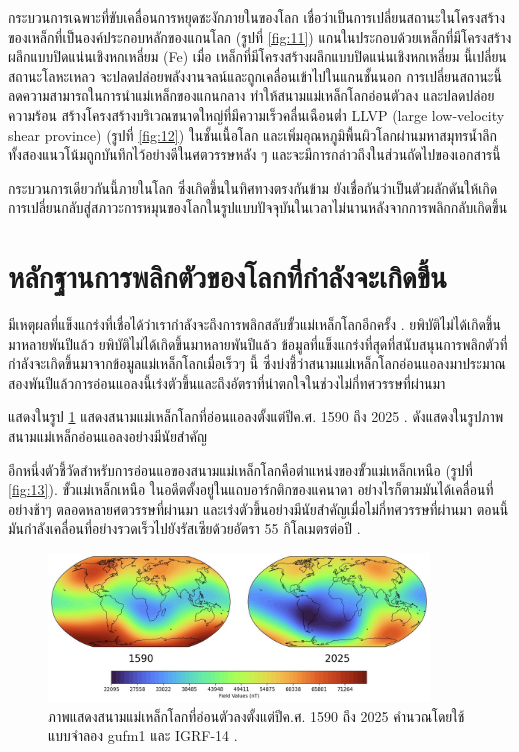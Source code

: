 \documentclass[10pt,twocolumn,letterpaper]{article}
\begin{document}
กระบวนการเฉพาะที่ขับเคลื่อนการหยุดชะงักภายในของโลก เชื่อว่าเป็นการเปลี่ยนสถานะในโครงสร้างของเหล็กที่เป็นองค์ประกอบหลักของแกนโลก (รูปที่ \ref{fig:11}) แกนในประกอบด้วยเหล็กที่มีโครงสร้างผลึกแบบปิดแน่นเชิงหกเหลี่ยม (Fe) \cite{141} เมื่อ เหล็กที่มีโครงสร้างผลึกแบบปิดแน่นเชิงหกเหลี่ยม นี้เปลี่ยนสถานะโลหะเหลว จะปลดปล่อยพลังงานจลน์และถูกเคลื่อนเข้าไปในแกนชั้นนอก การเปลี่ยนสถานะนี้ลดความสามารถในการนำแม่เหล็กของแกนกลาง ทำให้สนามแม่เหล็กโลกอ่อนตัวลง และปลดปล่อยความร้อน สร้างโครงสร้างบริเวณขนาดใหญ่ที่มีความเร็วคลื่นเฉือนต่ำ LLVP (large low-velocity shear province) (รูปที่ \ref{fig:12}) \cite{38} ในชั้นเนื้อโลก และเพิ่มอุณหภูมิพื้นผิวโลกผ่านมหาสมุทรน้ำลึก ทั้งสองแนวโน้มถูกบันทึกไว้อย่างดีในศตวรรษหลัง ๆ และจะมีการกล่าวถึงในส่วนถัดไปของเอกสารนี้



กระบวนการเดียวกันนี้ภายในโลก ซึ่งเกิดขึ้นในทิศทางตรงกันข้าม ยังเชื่อกันว่าเป็นตัวผลักดันให้เกิดการเปลี่ยนกลับสู่สภาวะการหมุนของโลกในรูปแบบปัจจุบันในเวลาไม่นานหลังจากการพลิกกลับเกิดขึ้น

\section{หลักฐานการพลิกตัวของโลกที่กำลังจะเกิดขึ้น}
มีเหตุผลที่แข็งแกร่งที่เชื่อได้ว่าเรากำลังจะถึงการพลิกสลับขั้วแม่เหล็กโลกอีกครั้ง . ยพิบัติไม่ได้เกิดขึ้นมาหลายพันปีแล้ว ยพิบัติไม่ได้เกิดขึ้นมาหลายพันปีแล้ว ข้อมูลที่แข็งแกร่งที่สุดที่สนับสนุนการพลิกตัวที่กำลังจะเกิดขึ้นมาจากข้อมูลแม่เหล็กโลกเมื่อเร็วๆ นี้ ซึ่งบ่งชี้ว่าสนามแม่เหล็กโลกอ่อนแอลงมาประมาณสองพันปีแล้วการอ่อนแอลงนี้เร่งตัวขึ้นและถึงอัตราที่น่าตกใจในช่วงไม่กี่ทศวรรษที่ผ่านมา

แสดงในรูป \ref{fig:14} แสดงสนามแม่เหล็กโลกที่อ่อนแอลงตั้งแต่ปีค.ศ. 1590 ถึง 2025 \cite{125,126}. ดังแสดงในรูปภาพ สนามแม่เหล็กอ่อนแอลงอย่างมีนัยสำคัญ 

อีกหนึ่งตัวชี้วัดสำหรับการอ่อนแอของสนามแม่เหล็กโลกคือตำแหน่งของขั้วแม่เหล็กเหนือ (รูปที่ \ref{fig:13}).  ขั้วแม่เหล็กเหนือ ในอดีตตั้งอยู่ในแถบอาร์กติกของแคนาดา อย่างไรก็ตามมันได้เคลื่อนที่อย่างช้าๆ ตลอดหลายศตวรรษที่ผ่านมา และเร่งตัวขึ้นอย่างมีนัยสำคัญเมื่อไม่กี่ทศวรรษที่ผ่านมา ตอนนี้มันกำลังเคลื่อนที่อย่างรวดเร็วไปยังรัสเซียด้วยอัตรา 55 กิโลเมตรต่อปี \cite{124}.

\begin{figure}[t]
\begin{center}
\includegraphics[width=0.9\textwidth]{saa.jpg}
\end{center}
   \caption{ภาพแสดงสนามแม่เหล็กโลกที่อ่อนตัวลงตั้งแต่ปีค.ศ. 1590 ถึง 2025 คำนวณโดยใช้แบบจำลอง gufm1 และ IGRF-14 \cite{125,126}.}
\label{fig:14}
\end{figure}
\end{document}
